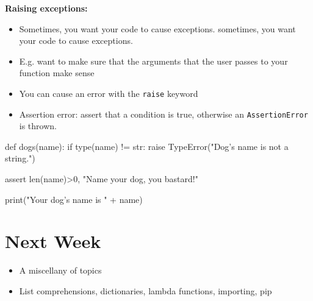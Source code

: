 \documentclass[12pt]{article}
\numberwithin{equation}{section}
\begin{document}
\textbf{Raising exceptions: }
\begin{itemize}
    \item Sometimes, you want your code to cause exceptions.
sometimes, you want your code to cause exceptions.
    \item E.g. want to make sure that the arguments that the user passes to your function make sense
    \item You can cause an error with the \verb|raise| keyword
    \item Assertion error: assert that a condition is true, otherwise an \verb|AssertionError| is thrown.
\end{itemize}
\begin{python}
def dogs(name):
    if type(name) != str:
        raise TypeError("Dog's name is not a string.")
    
    assert len(name)>0, "Name your dog, you bastard!"
    
    print("Your dog's name is " + name)
\end{python}

\section{Next Week}
\begin{itemize}
    \item A miscellany of topics
    \item List comprehensions, dictionaries, lambda functions, importing, pip
\end{itemize}
\end{document}
